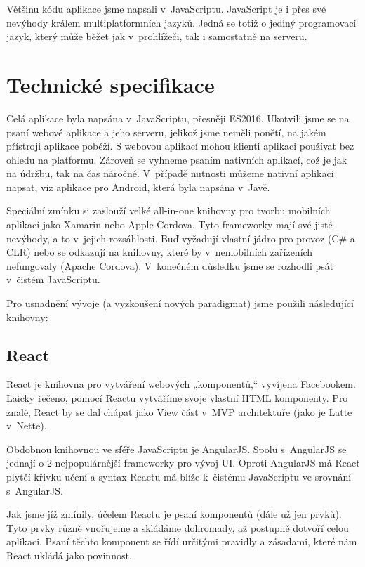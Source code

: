 \documentclass[a4paper,11pt,oneside]{article}
\begin{document}
Většinu kódu aplikace jsme napsali v~JavaScriptu. JavaScript je i přes své nevýhody králem multiplatformních jazyků. Jedná se totiž o jediný programovací jazyk, který může běžet jak v~prohlížeči, tak i samostatně na serveru.

\section{Technické specifikace}

Celá aplikace byla napsána v~JavaScriptu, přesněji ES2016. Ukotvili jsme se na psaní webové aplikace a jeho serveru, jelikož jsme neměli ponětí, na jakém přístroji aplikace poběží. S webovou aplikací mohou klienti aplikaci používat bez ohledu na platformu. Zároveň se vyhneme psaním nativních aplikací, což je jak na údržbu, tak na čas náročné. V~případě nutnosti můžeme nativní aplikaci napsat, viz aplikace pro Android, která byla napsána v~Javě. 

Speciální zmínku si zaslouží velké all-in-one knihovny pro tvorbu mobilních aplikací jako Xamarin nebo Apple Cordova. Tyto frameworky mají své jisté nevýhody, a to v~jejich rozsáhlosti. Buď vyžadují vlastní jádro pro provoz (C\# a CLR) nebo se odkazují na knihovny, které by v~nemobilních zařízeních nefungovaly (Apache Cordova). V~konečném důsledku jsme se rozhodli psát v~čistém JavaScriptu.

Pro usnadnění vývoje (a vyzkoušení nových paradigmat) jsme použili následující knihovny:

\subsection{React}
\label{sec:react}

React je knihovna pro vytváření webových „komponentů,“ vyvíjena Facebookem. Laicky řečeno, pomocí Reactu vytváříme svoje vlastní HTML komponenty. Pro znalé, React by se dal chápat jako View část v~MVP architektuře (jako je Latte v~Nette). 

Obdobnou knihovnou ve sféře JavaScriptu je AngularJS. Spolu s~AngularJS se jednají o 2 nejpopulárnější frameworky pro vývoj UI. Oproti AngularJS má React plytčí křivku učení a syntax Reactu má blíže k~čistému JavaScriptu ve srovnání s~AngularJS.

Jak jsme jíž zmínily, účelem Reactu je psaní komponentů (dále už jen prvků). Tyto prvky různě vnořujeme a skládáme dohromady, až postupně dotvoří celou aplikaci. Psaní těchto komponent se řídí určitými pravidly a zásadami, které nám React ukládá jako povinnost. 
\end{document}
